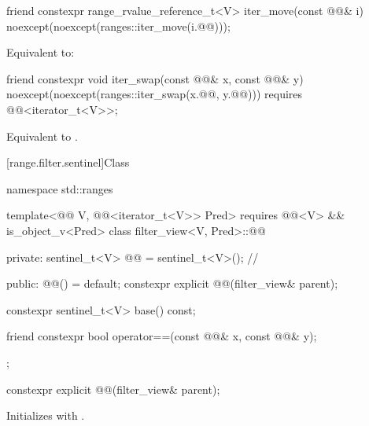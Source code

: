 %
\begin{itemdecl}
friend constexpr range_rvalue_reference_t<V> iter_move(const @@& i)
  noexcept(noexcept(ranges::iter_move(i.@@)));
\end{itemdecl}

\begin{itemdescr}
\pnum
\effects
Equivalent to: 
\end{itemdescr}

%
\begin{itemdecl}
friend constexpr void iter_swap(const @@& x, const @@& y)
  noexcept(noexcept(ranges::iter_swap(x.@@, y.@@)))
  requires @@<iterator_t<V>>;
\end{itemdecl}

\begin{itemdescr}
\pnum
\effects
Equivalent to .
\end{itemdescr}

[range.filter.sentinel]{Class }

%
\begin{codeblock}
namespace std::ranges {
  template<@@ V, @@<iterator_t<V>> Pred>
    requires @@<V> && is_object_v<Pred>
  class filter_view<V, Pred>::@@ {
  private:
    sentinel_t<V> @@ = sentinel_t<V>();       // \expos

  public:
    @@() = default;
    constexpr explicit @@(filter_view& parent);

    constexpr sentinel_t<V> base() const;

    friend constexpr bool operator==(const @@& x, const @@& y);
  };
}
\end{codeblock}

%
\begin{itemdecl}
constexpr explicit @@(filter_view& parent);
\end{itemdecl}

\begin{itemdescr}
\pnum
\effects
Initializes  with .
\end{itemdescr}


